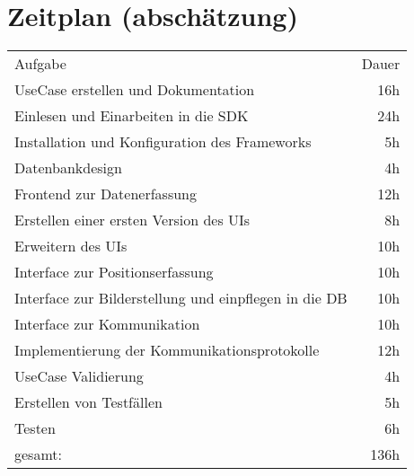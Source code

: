 \documentclass[a4paper,10pt]{article}
\begin{document}
\section{Zeitplan (abschätzung)}
\begin{tabular}{lr}
 Aufgabe & Dauer \\
 UseCase erstellen und Dokumentation & 16h \\
 Einlesen und Einarbeiten in die SDK & 24h \\
 Installation und Konfiguration des Frameworks & 5h \\
 Datenbankdesign & 4h \\
 Frontend zur Datenerfassung & 12h \\
 Erstellen einer ersten Version des UIs & 8h \\
 Erweitern des UIs & 10h \\
 Interface zur Positionserfassung & 10h \\
 Interface zur Bilderstellung und einpflegen in die DB & 10h \\
 Interface zur Kommunikation & 10h \\
 Implementierung der Kommunikationsprotokolle & 12h \\
 UseCase Validierung & 4h \\
 Erstellen von Testfällen & 5h \\
 Testen & 6h \\
 \hline
 gesamt: & 136h
\end{tabular}
\end{document}
